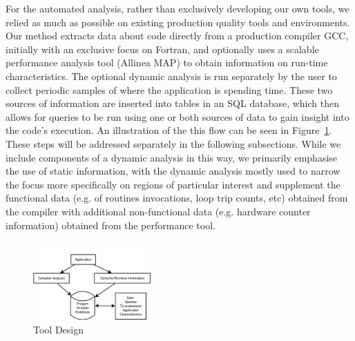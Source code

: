 For the automated analysis, rather than exclusively developing our own tools, we relied as much as possible on existing production quality tools and environments.
Our method extracts data about code directly from a production compiler \ac{GCC}, initially with an exclusive focus on Fortran, and optionally uses a scalable performance analysis tool (Allinea MAP)
to obtain information on run-time characteristics.
The optional dynamic analysis is run separately by the user to collect periodic samples of where the application is spending time.
These two sources of information are inserted into tables in an \acs{SQL} database, which then allows for queries to be run using one or both sources of data to gain insight into the code's execution.
An illustration of the this flow can be seen in Figure~\ref{fig:design}.
These steps will be addressed separately in the following subsections.
While we include components of a dynamic analysis in this way, we primarily emphasise the use of static information, with the dynamic analysis mostly used to narrow the focus more specifically on regions of particular interest and supplement the functional data (e.g. of routines invocations, loop trip counts, etc) obtained from the compiler with additional non-functional data (e.g. hardware counter information) obtained from the performance tool.

\begin{figure}
\begin{center}
\includegraphics[width=0.4\textwidth]{images/design.png}
\end{center}
\caption{Tool Design}
\label{fig:design}
\end{figure}

